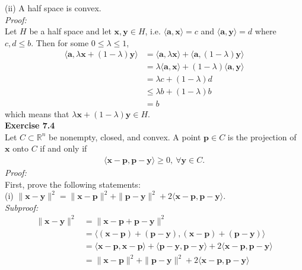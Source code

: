 \documentclass[letterpaper,12pt]{article}
\let\vec\mathbf
\theoremstyle{definition}
\begin{document}
(ii) A half space is convex. \\
\textit{Proof:} \\
Let $H$ be a half space and let $\vec{x}, \vec{y} \in H$, i.e. $\langle \vec{a}, \vec{x} \rangle = c$ and $\langle \vec{a}, \vec{y} \rangle = d$ where $c, d \leq b$. Then for some $0 \leq \lambda \leq 1$,
\begin{align*}
  \langle \vec{a}, \lambda \vec{x} + (1-\lambda) \vec{y} \rangle
  &= \langle \vec{a}, \lambda \vec{x} \rangle + \langle \vec{a}, (1-\lambda) \vec{y} \rangle \\
  &= \lambda \langle \vec{a}, \vec{x} \rangle + (1-\lambda) \langle \vec{a}, \vec{y} \rangle \\
  &= \lambda c + (1-\lambda) d \\
  &\leq \lambda b + (1-\lambda) b \\
  &= b
\end{align*}
which means that $\lambda \vec{x} + (1-\lambda) \vec{y} \in H$. \\

\textbf{Exercise 7.4} \\
Let $C \subset \mathbb{R}^n$ be nonempty, closed, and convex. A point $\vec{p} \in C$ is the projection of $\vec{x}$ onto $C$ if and only if
\begin{align}
  \langle \vec{x} - \vec{p}, \vec{p} - \vec{y} \rangle \geq 0, \ \forall \vec{y} \in C.
\end{align}
\textit{Proof:} \\
First, prove the following statements: \\
(i) $\|\vec{x} - \vec{y}\|^2 = \|\vec{x} - \vec{p}\|^2 + \|\vec{p} - \vec{y}\|^2 + 2 \langle \vec{x} - \vec{p}, \vec{p} - \vec{y} \rangle$. \\
\textit{Subproof:}
\begin{align*}
  \|\vec{x} - \vec{y}\|^2
  &= \|\vec{x} - \vec{p} + \vec{p} - \vec{y}\|^2 \\
  &= \langle (\vec{x} - \vec{p}) + (\vec{p} - \vec{y}), (\vec{x} - \vec{p}) + (\vec{p} - \vec{y})\rangle \\
  &= \langle \vec{x} - \vec{p}, \vec{x} - \vec{p} \rangle + \langle \vec{p} - \vec{y}, \vec{p} - \vec{y} \rangle + 2 \langle \vec{x} - \vec{p}, \vec{p} - \vec{y} \rangle \\
  &= \|\vec{x} - \vec{p}\|^2 + \|\vec{p} - \vec{y}\|^2 + 2 \langle \vec{x} - \vec{p}, \vec{p} - \vec{y} \rangle
\end{align*}
\end{document}
